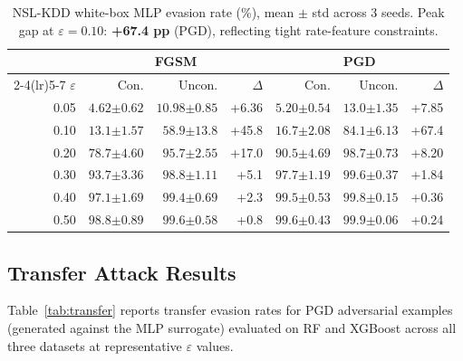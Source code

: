 \documentclass[sigconf,anonymous=true]{acmart}
\newcommand{\gap}[1]{\textcolor{deltagreen}{+#1}}
\begin{document}
\begin{table}[t]
\centering
\caption{NSL-KDD white-box MLP evasion rate (\%), mean $\pm$ std
         across 3 seeds.  Peak gap at $\varepsilon=0.10$: \textbf{+67.4 pp} (PGD),
         reflecting tight rate-feature constraints.}
\label{tab:nsl_wb}
\small
\begin{tabular}{r rr r rr r}
\toprule
 & \multicolumn{3}{c}{\textbf{FGSM}} & \multicolumn{3}{c}{\textbf{PGD}} \\
\cmidrule(lr){2-4}\cmidrule(lr){5-7}
$\varepsilon$ & Con. & Uncon. & $\Delta$ & Con. & Uncon. & $\Delta$ \\
\midrule
0.05 & $4.62{\scriptstyle\pm0.62}$ & $10.98{\scriptstyle\pm0.85}$ & \gap{6.36} &
       $5.20{\scriptstyle\pm0.54}$ & $13.0{\scriptstyle\pm1.35}$ & \gap{7.85} \\
0.10 & $13.1{\scriptstyle\pm1.57}$ & $58.9{\scriptstyle\pm13.8}$ & \gap{45.8} &
       $16.7{\scriptstyle\pm2.08}$ & $84.1{\scriptstyle\pm6.13}$ & \gap{67.4} \\
0.20 & $78.7{\scriptstyle\pm4.60}$ & $95.7{\scriptstyle\pm2.55}$ & \gap{17.0} &
       $90.5{\scriptstyle\pm4.69}$ & $98.7{\scriptstyle\pm0.73}$ & \gap{8.20} \\
0.30 & $93.7{\scriptstyle\pm3.36}$ & $98.8{\scriptstyle\pm1.11}$ & \gap{5.1} &
       $97.7{\scriptstyle\pm1.19}$ & $99.6{\scriptstyle\pm0.37}$ & \gap{1.84} \\
0.40 & $97.1{\scriptstyle\pm1.69}$ & $99.4{\scriptstyle\pm0.69}$ & \gap{2.3} &
       $99.5{\scriptstyle\pm0.53}$ & $99.8{\scriptstyle\pm0.15}$ & \gap{0.36} \\
0.50 & $98.8{\scriptstyle\pm0.89}$ & $99.6{\scriptstyle\pm0.58}$ & \gap{0.8} &
       $99.6{\scriptstyle\pm0.43}$ & $99.9{\scriptstyle\pm0.06}$ & \gap{0.24} \\
\bottomrule
\end{tabular}
\end{table}

\subsection{Transfer Attack Results}
\label{sec:transfer}

Table~\ref{tab:transfer} reports transfer evasion rates for PGD
adversarial examples (generated against the MLP surrogate) evaluated on
RF and XGBoost across all three datasets at representative
$\varepsilon$ values.
\end{document}

